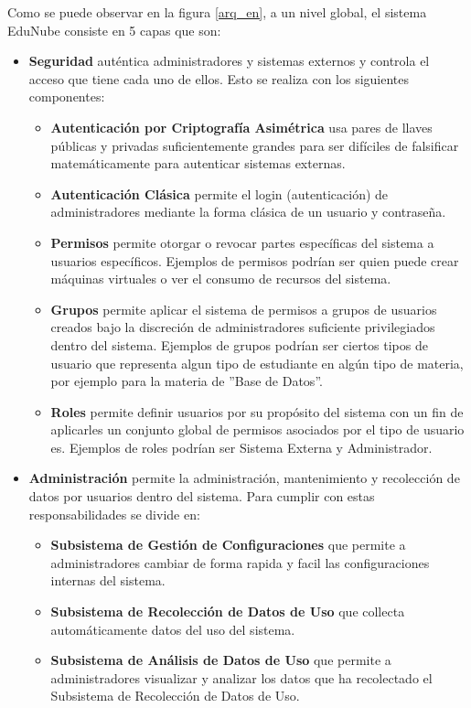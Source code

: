 Como se puede observar en la figura \ref{arq_en}, a un nivel global, el sistema EduNube consiste en 5 capas que son:
\begin{itemize}
	\item \textbf{Seguridad} auténtica administradores y sistemas externos y controla el acceso que tiene cada uno de ellos. Esto se realiza con los siguientes componentes:
    \begin{itemize}
    	\item \textbf{Autenticación por Criptografía Asimétrica} usa pares de llaves públicas y privadas suficientemente grandes para ser difíciles de falsificar matemáticamente para autenticar sistemas externas.
    	\item \textbf{Autenticación Clásica} permite el login (autenticación) de administradores mediante la forma clásica de un usuario y contraseña.
    	\item \textbf{Permisos} permite otorgar o revocar partes específicas del sistema a usuarios específicos. Ejemplos de permisos podrían ser quien puede crear máquinas virtuales o ver el consumo de recursos del sistema.
    	\item \textbf{Grupos} permite aplicar el sistema de permisos a grupos de usuarios creados bajo la discreción de administradores suficiente privilegiados dentro del sistema. Ejemplos de grupos podrían ser ciertos tipos de usuario que representa algun tipo de estudiante en algún tipo de materia, por ejemplo para la materia de ''Base de Datos''.
    	\item \textbf{Roles} permite definir usuarios por su propósito del sistema con un fin de aplicarles un conjunto global de permisos asociados por el tipo de usuario es. Ejemplos de roles podrían ser Sistema Externa y Administrador.
    \end{itemize}
	\item \textbf{Administración} permite la administración, mantenimiento y recolección de datos por usuarios dentro del sistema. Para cumplir con estas responsabilidades se divide en:
    \begin{itemize}
    	\item \textbf{Subsistema de Gestión de Configuraciones} que permite a administradores cambiar de forma rapida y facil las configuraciones internas del sistema.
    	\item \textbf{Subsistema de Recolección de Datos de Uso} que collecta automáticamente datos del uso del sistema.
    	\item \textbf{Subsistema de Análisis de Datos de Uso} que permite a administradores visualizar y analizar los datos que ha recolectado el Subsistema de Recolección de Datos de Uso.

\end{itemize}
\end{itemize}
